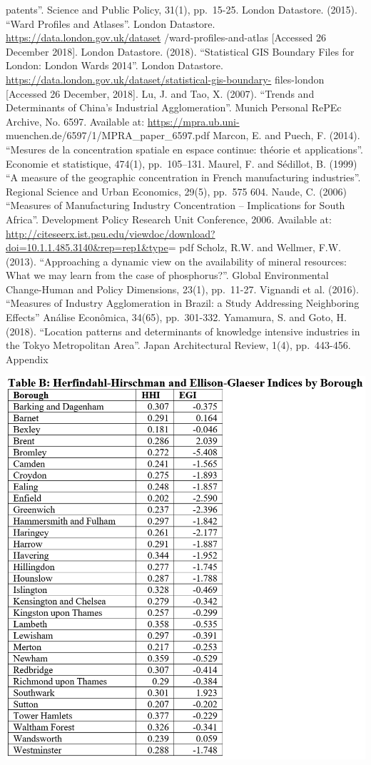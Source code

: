 \documentclass[]{article}
\begin{document}
patents''. Science and Public Policy, 31(1), pp.~15-25. London
Datastore. (2015). ``Ward Profiles and Atlases''. London Datastore.
\url{https://data.london.gov.uk/dataset} /ward-profiles-and-atlas
{[}Accessed 26 December 2018{]}. London Datastore. (2018). ``Statistical
GIS Boundary Files for London: London Wards 2014''. London Datastore.
\url{https://data.london.gov.uk/dataset/statistical-gis-boundary-}
files-london {[}Accessed 26 December, 2018{]}. Lu, J. and Tao, X.
(2007). ``Trends and Determinants of China's Industrial Agglomeration''.
Munich Personal RePEc Archive, No. 6597. Available at:
\url{https://mpra.ub.uni-} muenchen.de/6597/1/MPRA\_paper\_6597.pdf
Marcon, E. and Puech, F. (2014). ``Mesures de la concentration spatiale
en espace continue: théorie et applications''. Economie et statistique,
474(1), pp.~105--131. Maurel, F. and Sédillot, B. (1999) ``A measure of
the geographic concentration in French manufacturing industries''.
Regional Science and Urban Economics, 29(5), pp.~575 604. Naude, C.
(2006) ``Measures of Manufacturing Industry Concentration --
Implications for South Africa''. Development Policy Research Unit
Conference, 2006. Available at:
\url{http://citeseerx.ist.psu.edu/viewdoc/download?doi=10.1.1.485.3140\&rep=rep1\&type}=
pdf Scholz, R.W. and Wellmer, F.W. (2013). ``Approaching a dynamic view
on the availability of mineral resources: What we may learn from the
case of phosphorus?''. Global Environmental Change-Human and Policy
Dimensions, 23(1), pp.~11-27. Vignandi et al. (2016). ``Measures of
Industry Agglomeration in Brazil: a Study Addressing Neighboring
Effects'' Análise Econômica, 34(65), pp.~301-332. Yamamura, S. and Goto,
H. (2018). ``Location patterns and determinants of knowledge intensive
industries in the Tokyo Metropolitan Area''. Japan Architectural Review,
1(4), pp.~443-456. Appendix

\includegraphics[width=13.97in]{16}
\end{document}
